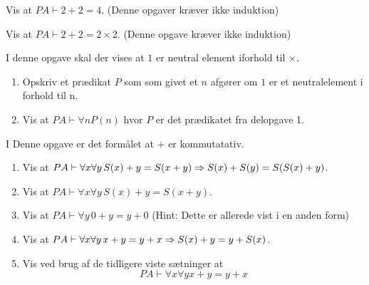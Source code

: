\ifx\preampleIncluded\undefined
\def\startOpgaverPeano{}


\fi
\begin{opg}
    Vis at $PA \vdash 2+2 = 4$. (Denne opgaver kræver ikke induktion)
\end{opg}

\begin{opg}
    Vis at $PA \vdash 2+2 = 2 \times 2$. (Denne opgave kræver ikke induktion)
\end{opg}

\begin{opg}
    I denne opgave skal der vises at $1$ er neutral element iforhold til $\times$.
    \begin{enumerate}
        \item Opskriv et prædikat $P$ som som givet et $n$ afgører om $1$ er et neutralelement i forhold til n.
        \item Vis at $PA \vdash \forall n P(n)$ hvor $P$ er det prædikatet fra delopgave 1.
    \end{enumerate}
\end{opg}

\begin{opg}
    I Denne opgave er det formålet at $+$ er kommutatativ.
    \begin{enumerate}
        \item Vis at $PA \vdash \forall x \forall y \, S(x) + y = S(x + y) \Rightarrow S(x) + S(y) = S(S(x) + y)$.
        \item Vis at $PA \vdash \forall x \forall y \, S(x) + y = S(x + y)$.
        \item Vis at $PA \vdash \forall y \, 0+y=y+0$ (Hint: Dette er allerede vist i en anden form)
        \item Vis at $PA \vdash \forall x \forall y \, x+y = y+x \Rightarrow S(x) + y = y + S(x)$.
        \item Vis ved brug af de tidligere viste sætninger at 
            \[PA \vdash \forall x \forall y x+y = y+x \]
    \end{enumerate}
\end{opg}

\ifdefined\startOpgaverPeano\fi
